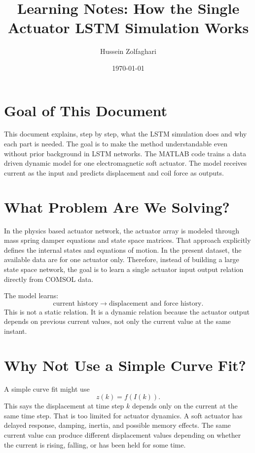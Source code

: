 \documentclass[11pt]{article}
\begin{document}
\title{\textbf{Learning Notes: How the Single Actuator LSTM Simulation Works}}
\author{Hussein Zolfaghari}
\date{\today}
\maketitle

\section{Goal of This Document}

This document explains, step by step, what the LSTM simulation does and why each part is needed. The goal is to make the method understandable even without prior background in LSTM networks. The MATLAB code trains a data driven dynamic model for one electromagnetic soft actuator. The model receives current as the input and predicts displacement and coil force as outputs.

\section{What Problem Are We Solving?}

In the physics based actuator network, the actuator array is modeled through mass spring damper equations and state space matrices. That approach explicitly defines the internal states and equations of motion. In the present dataset, the available data are for one actuator only. Therefore, instead of building a large state space network, the goal is to learn a single actuator input output relation directly from COMSOL data.

The model learns:
\begin{equation}
    \text{current history} \longrightarrow \text{displacement and force history}.
\end{equation}
This is not a static relation. It is a dynamic relation because the actuator output depends on previous current values, not only the current value at the same instant.

\section{Why Not Use a Simple Curve Fit?}

A simple curve fit might use
\begin{equation}
    z(k) = f(I(k)).
\end{equation}
This says the displacement at time step \(k\) depends only on the current at the same time step. That is too limited for actuator dynamics. A soft actuator has delayed response, damping, inertia, and possible memory effects. The same current value can produce different displacement values depending on whether the current is rising, falling, or has been held for some time.
\end{document}
